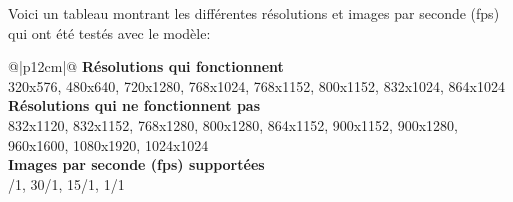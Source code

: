 \par Voici un tableau montrant les différentes résolutions et images par seconde (\acrshort{fps}) qui ont été testés avec le modèle:
{
    \renewcommand*{\arraystretch}{1.4}
    \begin{table}[ht]
    \centering
    \caption{Résolutions et images par seconde (\acrshort{fps}) testés}\label{table:resolutions_tested}
    \vspace{0.3em} %
    \begin{tabular}{{@{}|p{12cm}|@{}}}
         \hline
         \textbf{Résolutions qui fonctionnent}\\
         \hline
        320x576, 480x640, 720x1280, 768x1024, 768x1152, 800x1152, 832x1024, 864x1024\\
        \hline
        \textbf{Résolutions qui ne fonctionnent pas}\\
        \hline
        832x1120, 832x1152, 768x1280, 800x1280, 864x1152, 900x1152, 900x1280, 960x1600, 1080x1920, 1024x1024\\
        \hline
        \textbf{Images par seconde (\acrshort{fps}) supportées}\\
        /1, 30/1, 15/1, 1/1\\
        \hline
    \end{tabular}
    \end{table}
}